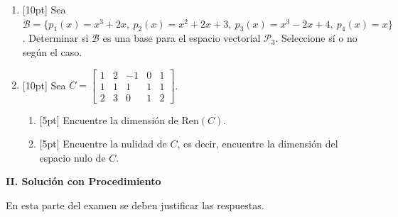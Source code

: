 \documentclass[11pt]{article}
\newcommand{\sinosino}{\fbox{$SI$}\hspace{0.5cm}\fbox{$NO$}}
\begin{document}
\begin{enumerate}
\vspace{4pt}

\item{}[10pt] Sea $\mathcal{B}=\{p_1(x)=x^3+2x,\ p_2(x)=x^2+2x+3,\ p_3(x)=x^3-2x+4,\ p_4(x)=x\}$. Determinar si $\mathcal{B}$ es una base para el espacio vectorial $\mathcal{P}_3$. Seleccione sí o no según el caso.

\vspace{6pt}
\begin{center}
\sinosino
\end{center}

\item{}[10pt] Sea $C = \begin{bmatrix}1&2&-1&0&1\\1&1&1&1&1\\2&3&0&1&2\end{bmatrix}$.
\begin{enumerate}
\item{}[5pt] Encuentre la dimensión de $\mathrm{Ren}(C)$.

\vspace{4pt}

\item{}[5pt] Encuentre la nulidad de $C$, es decir, encuentre la dimensión del espacio nulo de $C$.

\vspace{4pt}
\end{enumerate}
\end{enumerate}

\vspace{6pt}
\noindent\textbf{\large II. Solución con Procedimiento}

\vspace{4pt}
\noindent En esta parte del examen se deben justificar las respuestas.
\end{document}
